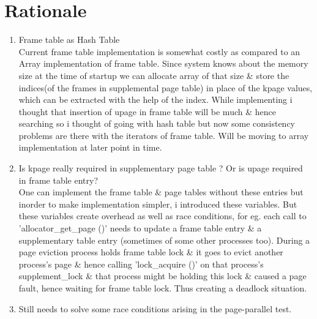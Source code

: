 \documentclass[a4,11pt]{article}
\begin{document}
\section{Rationale}
\begin{enumerate}
\item \textsf{Frame table as Hash Table} \\
Current frame table implementation is somewhat costly as compared to an Array implementation of frame table. Since system knows about the memory size at the time of startup we can allocate array of that size \& store the indices(of the frames in supplemental page table) in place of the kpage values, which can be extracted with the help of the index. While implementing i thought that insertion of upage in frame table will be much \& hence searching so i thought of going with hash table but now  some consistency problems are there with the iterators of frame table. Will be moving to array implementation at later point in time.

\item \textsf{Is kpage really required in supplementary page table ? Or is upage required in frame table entry? }\\
One can implement the frame table \& page tables without these entries but inorder to make implementation simpler, i introduced these variables. But these variables create overhead as well as race conditions, for eg. each call to 'allocator\_get\_page ()' needs to update a frame table entry \& a supplementary table entry (sometimes of some other processes too). During a page eviction process holds frame table lock \& it goes to evict another process's page \& hence calling 'lock\_acquire ()' on that process's supplement\_lock \& that process might be holding this lock \& caused a page fault, hence waiting for frame table lock. Thus creating a deadlock situation.

\item Still needs to solve some race conditions arising in the page-parallel test.
\end{enumerate}
\end{document}
